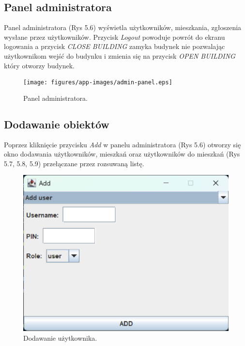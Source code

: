 \subsection{Panel administratora}
Panel administratora (Rys 5.6) wyświetla użytkowników, mieszkania, zgłoszenia wysłane przez użytkowników.
Przycisk \textit{Logout} powoduje powrót do ekranu logowania a przycisk \textit{CLOSE BUILDING} zamyka budynek nie pozwalając użytkownikom 
wejść do budynku i zmienia się na przycisk \textit{OPEN BUILDING} który otworzy budynek.
\begin{figure}[H]
    \centering
    \texttt{[image: figures/app-images/admin-panel.eps]}
    \caption{Panel administratora.\label{fig11}}
\end{figure}

\newpage
\subsection{Dodawanie obiektów}
Poprzez kliknięcie przycisku \textit{Add} w panelu administratora (Rys 5.6) otworzy się okno dodawania użytkowników, mieszkań 
oraz użytkowników do mieszkań (Rys 5.7, 5.8, 5.9) przełączane przez rozsuwaną listę.

\begin{figure}[H]
    \centering
    \includegraphics[width=\textwidth,height=0.2\textheight,keepaspectratio]{figures/app-images/Add/add-user.eps}
    \caption{Dodawanie użytkownika.\label{fig12}}
\end{figure}

